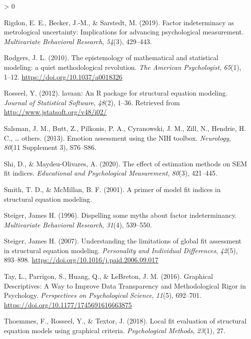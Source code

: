 \documentclass[
  english,
  man]{apa6}
\newlength{\cslhangindent}
\newenvironment{CSLReferences}[2] %
 {%
  \setlength{\parindent}{0pt}
  \ifodd #1 \everypar{\setlength{\hangindent}{\cslhangindent}}\ignorespaces\fi
  \ifnum #2 > 0
  \setlength{\parskip}{#2\baselineskip}
  \fi
 }%
 {}
\begin{document}
\begin{CSLReferences}{1}{0}
\leavevmode\hypertarget{ref-rigdon2019factor}{}%
Rigdon, E. E., Becker, J.-M., \& Sarstedt, M. (2019). Factor indeterminacy as metrological uncertainty: Implications for advancing psychological measurement. \emph{Multivariate Behavioral Research}, \emph{54}(3), 429--443.

\leavevmode\hypertarget{ref-rodgers_epistemology_2010}{}%
Rodgers, J. L. (2010). {The epistemology of mathematical and statistical modeling: a quiet methodological revolution}. \emph{The American Psychologist}, \emph{65}(1), 1--12. \url{https://doi.org/10.1037/a0018326}

\leavevmode\hypertarget{ref-lavaan}{}%
Rosseel, Y. (2012). {lavaan}: An {R} package for structural equation modeling. \emph{Journal of Statistical Software}, \emph{48}(2), 1--36. Retrieved from \url{http://www.jstatsoft.org/v48/i02/}

\leavevmode\hypertarget{ref-salsman2013emotion}{}%
Salsman, J. M., Butt, Z., Pilkonis, P. A., Cyranowski, J. M., Zill, N., Hendrie, H. C., \ldots{} others. (2013). Emotion assessment using the {NIH} toolbox. \emph{Neurology}, \emph{80}(11 Supplement 3), S76--S86.

\leavevmode\hypertarget{ref-shi2020effect}{}%
Shi, D., \& Maydeu-Olivares, A. (2020). The effect of estimation methods on {SEM} fit indices. \emph{Educational and Psychological Measurement}, \emph{80}(3), 421--445.

\leavevmode\hypertarget{ref-smith2001primer}{}%
Smith, T. D., \& McMillan, B. F. (2001). A primer of model fit indices in structural equation modeling.

\leavevmode\hypertarget{ref-steiger1996dispelling}{}%
Steiger, James H. (1996). Dispelling some myths about factor indeterminancy. \emph{Multivariate Behavioral Research}, \emph{31}(4), 539--550.

\leavevmode\hypertarget{ref-Steiger2007}{}%
Steiger, James H. (2007). {Understanding the limitations of global fit assessment in structural equation modeling}. \emph{Personality and Individual Differences}, \emph{42}(5), 893--898. \url{https://doi.org/10.1016/j.paid.2006.09.017}

\leavevmode\hypertarget{ref-Tay2016a}{}%
Tay, L., Parrigon, S., Huang, Q., \& LeBreton, J. M. (2016). {Graphical Descriptives: A Way to Improve Data Transparency and Methodological Rigor in Psychology}. \emph{Perspectives on Psychological Science}, \emph{11}(5), 692--701. \url{https://doi.org/10.1177/1745691616663875}

\leavevmode\hypertarget{ref-thoemmes2018local}{}%
Thoemmes, F., Rosseel, Y., \& Textor, J. (2018). Local fit evaluation of structural equation models using graphical criteria. \emph{Psychological Methods}, \emph{23}(1), 27.


\end{CSLReferences}
\end{document}
